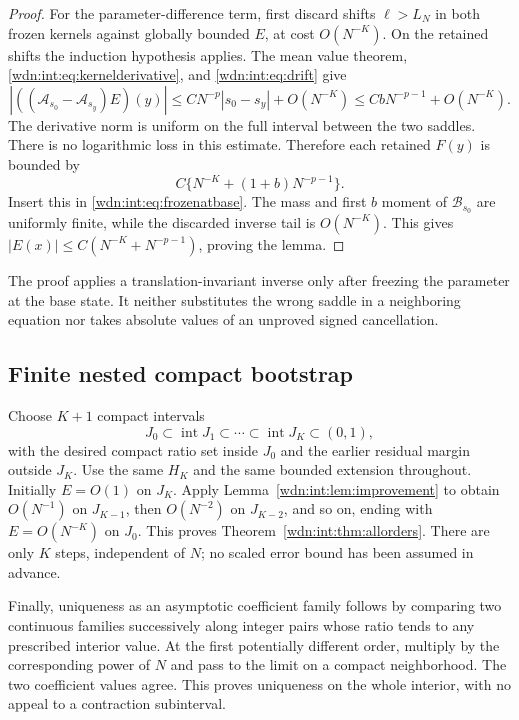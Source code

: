 \documentclass[11pt,letterpaper]{article}
\theoremstyle{remark}\newtheorem{remark}[theorem]{Remark}
\begin{document}
\begin{proof}
For the parameter-difference term, first discard shifts $\ell>L_N$
in both frozen kernels against globally bounded $E$, at cost
$O(N^{-K})$. On the retained shifts the induction hypothesis applies.
The mean value theorem, \eqref{wdn:int:eq:kernelderivative}, and
\eqref{wdn:int:eq:drift} give
\begin{equation}\label{wdn:int:eq:neighborbound}
 |((\mathcal A_{s_0}-\mathcal A_{s_y})E)(y)|
 \le C N^{-p}|s_0-s_y|+O(N^{-K})
 \le CbN^{-p-1}+O(N^{-K}).
\end{equation}
The derivative norm is uniform on the full interval between the two
saddles. There is no logarithmic loss in this estimate.
Therefore each retained $F(y)$ is bounded by
\[
 C\{N^{-K}+(1+b)N^{-p-1}\}.
\]
Insert this in \eqref{wdn:int:eq:frozenatbase}. The mass and first $b$ moment of
$\mathcal B_{s_0}$ are uniformly finite, while the discarded inverse tail
is $O(N^{-K})$. This gives
$|E(x)|\le C(N^{-K}+N^{-p-1})$, proving the lemma.
\end{proof}
The proof applies a translation-invariant inverse only after freezing
the parameter at the base state. It neither substitutes the wrong saddle
in a neighboring equation nor takes absolute values of an unproved
signed cancellation.

\subsection{Finite nested compact bootstrap}
Choose $K+1$ compact intervals
\[
 J_0\subset\operatorname{int}J_1\subset\cdots
     \subset\operatorname{int}J_K\subset(0,1),
\]
with the desired compact ratio set inside $J_0$ and the earlier residual
margin outside $J_K$. Use the same $H_K$ and the same bounded extension
throughout. Initially $E=O(1)$ on $J_K$. Apply
Lemma~\ref{wdn:int:lem:improvement} to obtain $O(N^{-1})$ on $J_{K-1}$,
then $O(N^{-2})$ on $J_{K-2}$, and so on, ending with
$E=O(N^{-K})$ on $J_0$. This proves Theorem~\ref{wdn:int:thm:allorders}.
There are only $K$ steps, independent of $N$; no scaled error bound has
been assumed in advance.

Finally, uniqueness as an asymptotic coefficient family follows by
comparing two continuous families successively along integer pairs whose
ratio tends to any prescribed interior value. At the first potentially
different order, multiply by the corresponding power of $N$ and pass
to the limit on a compact neighborhood. The two coefficient values
agree. This proves uniqueness on the whole interior, with no appeal to
a contraction subinterval.
\end{document}

